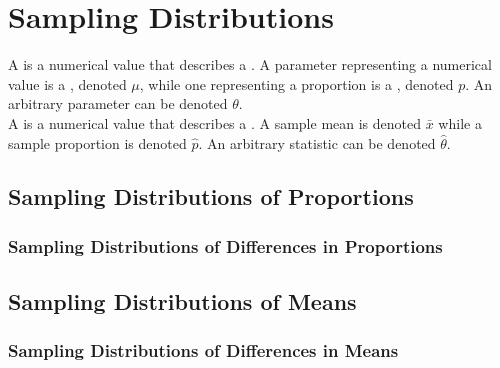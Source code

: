 \documentclass[../AP_Statistics.tex]{subfiles}
\begin{document}
	\chapter{Sampling Distributions}
		A  is a numerical value that describes a . A parameter representing a numerical value is a , denoted $\mu$, while one representing a proportion is a , denoted $p$. An arbitrary parameter can be denoted $\theta$. \\
		A  is a numerical value that describes a . A sample mean is denoted $\bar{x}$ while a sample proportion is denoted $\hat{p}$. An arbitrary statistic can be denoted $\hat{\theta}$. \\
		
		\section{Sampling Distributions of Proportions}
			\subsection*{Sampling Distributions of Differences in Proportions}
		\section{Sampling Distributions of Means}
			\subsection*{Sampling Distributions of Differences in Means}
\end{document}
